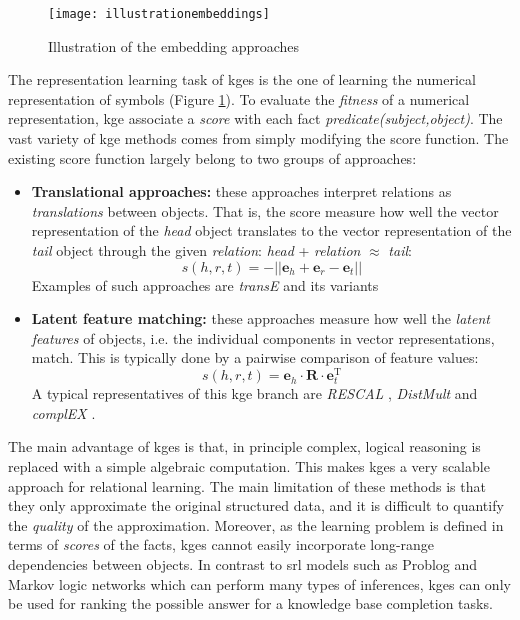  \begin{figure}
	\centering
	\texttt{[image: illustrationembeddings]}
	\caption{Illustration of the embedding approaches}
	\label{fig:emb}
\end{figure}




The representation learning task of \gls{kge}s is the one of learning the numerical representation of symbols (Figure \ref{fig:emb}).
To evaluate the \textit{fitness} of a numerical representation, \gls{kge} associate a \textit{score} with each fact \textit{predicate(subject,object)}.
The vast variety of \gls{kge} methods comes from simply modifying the score function.
The existing score function largely belong to two groups of approaches:
\begin{itemize}
	\item \textbf{Translational approaches:} these approaches interpret relations as \textit{translations} between objects. That is, the score measure how well the vector representation of the \textit{head} object translates to the vector representation of the \textit{tail} object through the given \textit{relation}: \textit{head} + \textit{relation} $\approx$ \textit{tail}:
		\begin{equation}
			s(h,r,t) = - || \mathbf{e}_{h} + \mathbf{e}_{r} - \mathbf{e}_{t} ||
		\end{equation}
		Examples of such approaches are \textit{transE} \cite{Bordes:2013:TEM} and its variants \cite{Lin:2015:LER:2886521.2886624,nguyen-EtAl:2016:N16-1,Arbelaitz:2013,P15-1067}
	\item \textbf{Latent feature matching:} these approaches measure how well the \textit{latent features} of objects, i.e. the individual components in vector representations, match. This is typically done by a pairwise comparison of feature values:
	 	\begin{equation}
	 		s(h,r,t) = \mathbf{e}_{h} \cdot \mathbf{R} \cdot \mathbf{e}_{t}^{\text{T}}
	 	\end{equation}
	 	A typical representatives of this \gls{kge} branch are \textit{RESCAL} \cite{Nickel2011}, \textit{DistMult} \cite{YangYHGD14a} and \textit{complEX} \cite{trouillon2016complex}.
\end{itemize}


The main advantage of \gls{kge}s is that, in principle complex, logical reasoning is replaced with a simple algebraic computation.
This makes \gls{kge}s a very scalable approach for relational learning.
The main limitation of these methods is that they only approximate the original structured data, and it is difficult to quantify the \textit{quality} of the approximation.
Moreover, as the learning problem is defined in terms of \textit{scores} of the facts, \gls{kge}s cannot easily incorporate  long-range dependencies between objects.
In contrast to \gls{srl} models such as Problog and Markov logic networks which can perform many types of inferences, \gls{kge}s can only be used for ranking the possible answer for a knowledge base completion tasks. 
   

